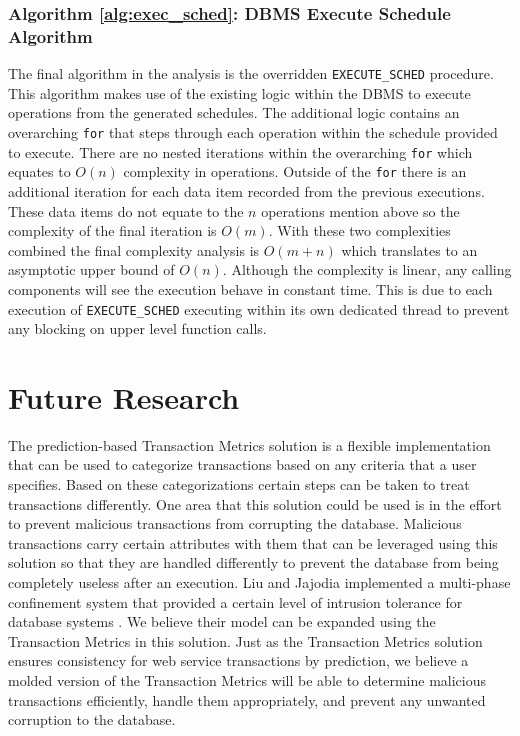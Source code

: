 \documentclass[conference]{IEEEtran}
\begin{document}
\subsubsection{Algorithm \ref{alg:exec_sched}: DBMS Execute Schedule Algorithm}
\label{alg_complexity:exec_sched}
The final algorithm in the analysis is the overridden \verb|EXECUTE_SCHED| procedure. This algorithm makes use of the existing logic within the DBMS to execute operations from the generated schedules. The additional logic contains an overarching \verb|for| that steps through each operation within the schedule provided to execute. There are no nested iterations within the overarching \verb|for| which equates to $O(n)$ complexity in operations. Outside of the \verb|for| there is an additional iteration for each data item recorded from the previous executions. These data items do not equate to the $n$ operations mention above so the complexity of the final iteration is $O(m)$. With these two complexities combined the final complexity analysis is $O(m+n)$ which translates to an asymptotic upper bound of $O(n)$. Although the complexity is linear, any calling components will see the execution behave in constant time. This is due to each execution of \verb|EXECUTE_SCHED| executing within its own dedicated thread to prevent any blocking on upper level function calls.

\section{Future Research}
The prediction-based Transaction Metrics solution is a flexible implementation that can be used to categorize transactions based on any criteria that a user specifies. Based on these categorizations certain steps can be taken to treat transactions differently. One area that this solution could be used is in the effort to prevent malicious transactions from corrupting the database. Malicious transactions carry certain attributes with them that can be leveraged using this solution so that they are handled differently to prevent the database from being completely useless after an execution. Liu and Jajodia implemented a multi-phase confinement system that provided a certain level of intrusion tolerance for database systems \cite{Liu_Intrusion}. We believe their model can be expanded using the Transaction Metrics in this solution. Just as the Transaction Metrics solution ensures consistency for web service transactions by prediction, we believe a molded version of the Transaction Metrics will be able to determine malicious transactions efficiently, handle them appropriately, and prevent any unwanted corruption to the database.
\end{document}
